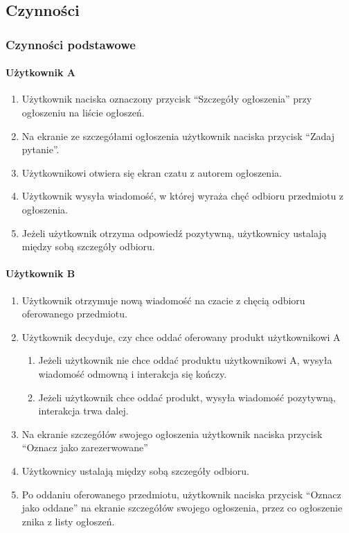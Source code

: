\documentclass[licencjacka]{pracamgr}
\begin{document}
    \subsection{Czynności}
    \subsubsection{Czynności podstawowe}
    \paragraph{Użytkownik A}
    \begin{enumerate}
        \item Użytkownik naciska oznaczony przycisk ``Szczegóły ogłoszenia'' przy ogłoszeniu na liście ogłoszeń.
        \item Na ekranie ze szczegółami ogłoszenia użytkownik naciska przycisk ``Zadaj pytanie''.
        \item Użytkownikowi otwiera się ekran czatu z autorem ogłoszenia.
        \item Użytkownik wysyła wiadomość, w której wyraża chęć odbioru przedmiotu z ogłoszenia.
        \item Jeżeli użytkownik otrzyma odpowiedź pozytywną, użytkownicy ustalają między sobą szczegóły odbioru.
    \end{enumerate}
    \paragraph{Użytkownik B}
    \begin{enumerate}
        \item Użytkownik otrzymuje nową wiadomość na czacie z chęcią odbioru oferowanego przedmiotu.
        \item Użytkownik decyduje, czy chce oddać oferowany produkt użytkownikowi A
        \begin{enumerate}
            \item Jeżeli użytkownik nie chce oddać produktu użytkownikowi A, wysyła wiadomość odmowną i interakcja się kończy.
            \item Jeżeli użytkownik chce oddać produkt, wysyła wiadomość pozytywną, interakcja trwa dalej.
        \end{enumerate}
        \item Na ekranie szczegółów swojego ogłoszenia użytkownik naciska przycisk ``Oznacz jako zarezerwowane''
        \item Użytkownicy ustalają między sobą szczegóły odbioru.
        \item Po oddaniu oferowanego przedmiotu, użytkownik naciska przycisk ``Oznacz jako oddane'' na ekranie szczegółów swojego ogłoszenia, przez co ogłoszenie znika z listy ogłoszeń.
    \end{enumerate}
\end{document}
